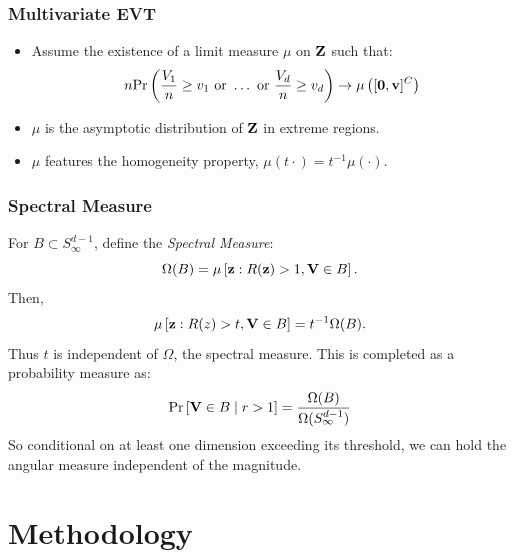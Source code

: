 \documentclass[aspectratio=169]{beamer}
\begin{document}
\begin{frame}
  \frametitle{Multivariate EVT}
  \begin{itemize}
    \item Assume the existence of a limit measure $\mu$ on ${\bf Z}$ such that:
    \begin{equation*}
      n\text{Pr}\left(\frac{V_1}{n} \geq v_1 \text{ or }\ldots\text{ or }\frac{V_d}{n}\geq v_d\right)
      \rightarrow \mu\left([{\bf 0}, {\bf v}]^C\right)
    \end{equation*}
    \item $\mu$ is the asymptotic distribution of ${\bf Z}$ in extreme regions.
    \item $\mu$ features the homogeneity property, $\mu(t\cdot) = t^{-1}\mu(\cdot)$.
  \end{itemize}
\end{frame}

\begin{frame}
  \frametitle{Spectral Measure}
  For $B \subset S_{\infty}^{d-1}$, define the \emph{Spectral Measure}:
  \begin{equation*}
    \Omega(B) = \mu\left[{\bf z}: R({\bf z}) > 1, {\bf V} \in B\right].
  \end{equation*}
  Then,
  \begin{equation*}
    \mu\left[{\bf z}:R(z)>t, {\bf V}\in B\right] = t^{-1}\Omega(B).
  \end{equation*}
  Thus $t$ is independent of $\Omega$, the spectral measure.  This is completed as a
    probability measure as:
  \begin{equation*}
    \text{Pr}\left[{\bf V} \in B \mid r > 1\right] = \frac{\Omega(B)}{\Omega(S_{\infty}^{d-1})}
  \end{equation*}
  So conditional on at least one dimension exceeding its threshold, we can hold the
  angular measure independent of the magnitude.
\end{frame}

\section{Methodology}
\end{document}
